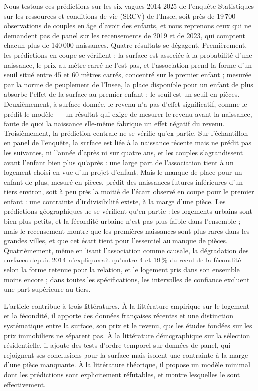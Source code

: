 \documentclass[11pt,a4paper]{article}
\theoremstyle{plain}
\theoremstyle{definition}
\theoremstyle{remark}
\begin{document}
Nous testons ces prédictions sur les six vagues 2014-2025 de l'enquête Statistiques sur les ressources et conditions de vie (SRCV) de l'Insee, soit près de 19\,700 observations de couples en âge d'avoir des enfants, et nous reprenons ceux qui ne demandent pas de panel sur les recensements de 2019 et de 2023, qui comptent chacun plus de 140\,000 naissances. Quatre résultats se dégagent. Premièrement, les prédictions en coupe se vérifient : la surface est associée à la probabilité d'une naissance, le prix au mètre carré ne l'est pas, et l'association prend la forme d'un seuil situé entre 45 et 60 mètres carrés, concentré sur le premier enfant ; mesurée par la norme de peuplement de l'Insee, la place disponible pour un enfant de plus absorbe l'effet de la surface au premier enfant : le seuil est un seuil en pièces. Deuxièmement, à surface donnée, le revenu n'a pas d'effet significatif, comme le prédit le modèle — un résultat qui exige de mesurer le revenu avant la naissance, faute de quoi la naissance elle-même fabrique un effet négatif du revenu. Troisièmement, la prédiction centrale ne se vérifie qu'en partie. Sur l'échantillon en panel de l'enquête, la surface est liée à la naissance récente mais ne prédit pas les suivantes, ni l'année d'après ni sur quatre ans, et les couples s'agrandissent avant l'enfant bien plus qu'après : une large part de l'association tient à un logement choisi en vue d'un projet d'enfant. Mais le manque de place pour un enfant de plus, mesuré en pièces, prédit des naissances futures inférieures d'un tiers environ, soit à peu près la moitié de l'écart observé en coupe pour le premier enfant : une contrainte d'indivisibilité existe, à la marge d'une pièce. Les prédictions géographiques ne se vérifient qu'en partie : les logements urbains sont bien plus petits, et la fécondité urbaine n'est pas plus faible dans l'ensemble ; mais le recensement montre que les premières naissances sont plus rares dans les grandes villes, et que cet écart tient pour l'essentiel au manque de pièces. Quatrièmement, même en lisant l'association comme causale, la dégradation des surfaces depuis 2014 n'expliquerait qu'entre 4 et 19\,\% du recul de la fécondité selon la forme retenue pour la relation, et le logement pris dans son ensemble moins encore ; dans toutes les spécifications, les intervalles de confiance excluent une part supérieure au tiers.

L'article contribue à trois littératures. À la littérature empirique sur le logement et la fécondité, il apporte des données françaises récentes et une distinction systématique entre la surface, son prix et le revenu, que les études fondées sur les prix immobiliers ne séparent pas. À la littérature démographique sur la sélection résidentielle, il ajoute des tests d'ordre temporel sur données de panel, qui rejoignent ses conclusions pour la surface mais isolent une contrainte à la marge d'une pièce manquante. À la littérature théorique, il propose un modèle minimal dont les prédictions sont explicitement réfutables, et montre lesquelles le sont effectivement.
\end{document}
